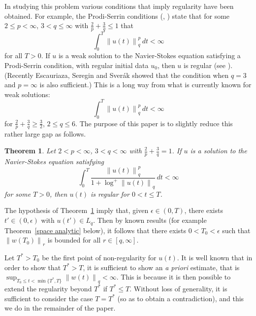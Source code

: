 \documentclass[12pt]{amsart}
\newtheorem{thm}{Theorem}[section]
\theoremstyle{remark}
\newcommand{\smodo}[1]{{\mathopen|#1\mathclose|}}
\newcommand{\snormo}[1]{{\mathopen\|#1\mathclose\|}}
\begin{document}
In studying this problem various conditions that imply regularity
have been obtained.  For example, the 
Prodi-Serrin conditions (\cite{prodi}, \cite{serrin})
state that for some
$2 \le p < \infty$, $3<q\le\infty$ with
$\frac2p + \frac 3q \le 1$ that
$$ \int_0^T \snormo{u(t)}_q^p \, dt < \infty $$
for all $T>0$.
If $u$ is
a weak solution to the Navier-Stokes equation 
satisfying a Prodi-Serrin condition,
with regular initial
data $u_0$, then $u$ is regular (see \cite{sohr}).
(Recently Escauriaza, Seregin and Sver\'ak \cite{escauriaza et al}
showed that the condition when $q=3$ and $p=\infty$ is also sufficient.)
This is a long way from what is currently known for weak
solutions:
$$ \int_0^T \snormo{u(t)}_q^p \, dt < \infty $$
for $\frac2p + \frac 3q \ge \frac32$, $2 \le q \le 6$.
The purpose of this paper is to slightly reduce this rather
large gap as follows.

%

\begin{thm} \label{main}
Let 
$2 < p < \infty$, $3<q < \infty$ with
$\frac2p+\frac3q=1$.
If $u$ is a solution to the Navier-Stokes equation satisfying
$$ \int_0^T \frac{\snormo{u(t)}_q^p}{1+\log^+\snormo{u(t)}_q}
   \, dt < \infty $$
for some $T>0$, 
then $u(t)$ 
is regular for $0 < t\le T$.
\end{thm}

The hypothesis of Theorem~\ref{main} imply that, 
given $\epsilon \in (0,T)$, there exists
$t' \in (0,\epsilon)$ with $u(t') \in L_q$.
Then by known results (for example Theorem~\ref{space analytic} below), 
it follows
that there exists $0 < T_0<\epsilon$ such that 
$\snormo{w(T_0)}_{r}$ is bounded for all $r \in [q,\infty]$.

Let $T^* > T_0$ be the first point of non-regularity for $u(t)$.
It is well known that 
in order to show that $T^* > T$,
it is sufficient to show an \emph{a priori} estimate, that is
$\sup_{T_0 \le t < \min\{T^*,T\}} \snormo{w(t)}_q < \infty$.
This is because it is then possible to extend the regularity beyond
$T^*$ if $T^* \le T$.
Without loss of generality, it is sufficient to consider the case
$T = T^*$ (so as to obtain a contradiction), and this we do
in the remainder of the paper.
\end{document}
